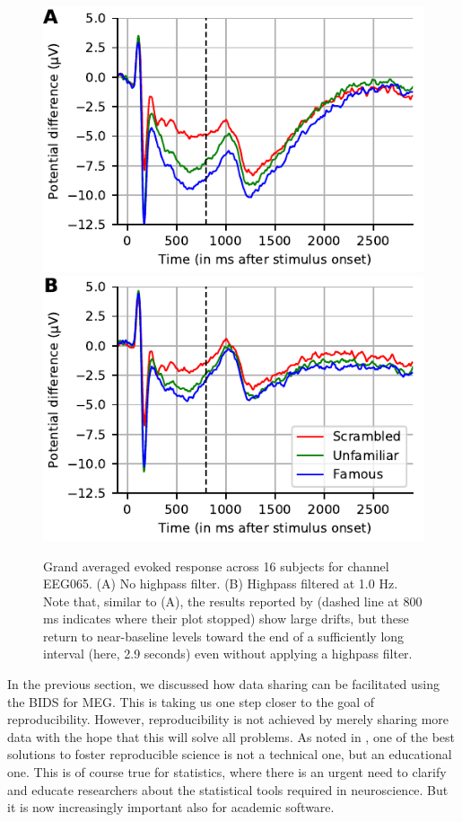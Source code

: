 \begin{figure}[t]
  \centering
  \includegraphics[width=0.7\linewidth]{figures/grand_average_highpass-NoneHz.pdf}\\
  \includegraphics[width=0.7\linewidth]{figures/grand_average_highpass-1Hz.pdf}
\caption[]{Grand averaged evoked response across 16 subjects for channel EEG065.
(A) No highpass filter. (B) Highpass filtered at 1.0 Hz. Note that, similar to (A), the results reported by \cite{wakeman2015multi} (dashed line at 800 ms indicates where their plot stopped) show large drifts, but these return to near-baseline levels toward the end of a sufficiently long interval (here, 2.9 seconds) even without applying a highpass filter.}
\label{fig:sommaire:grand_average}
\end{figure}  

In the previous section, we discussed how data sharing can be facilitated using the \ac{BIDS} for \ac{MEG}. This is taking us one step closer to the goal of reproducibility. However, reproducibility is not achieved by merely sharing more data with the hope that this will solve all problems. As noted in \citet{baker20161}, one of the best solutions to foster reproducible science is not a technical one, but an educational one. This is of course true for statistics, where there is an urgent need to clarify and educate researchers about the statistical tools required in neuroscience. But it is now increasingly important also for academic software.

